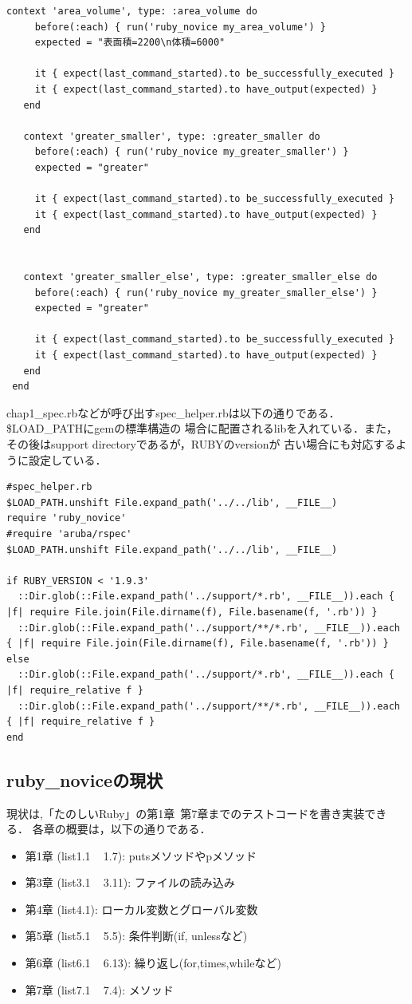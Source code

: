 \begin{lstlisting}[style=customRuby]
   context 'area_volume', type: :area_volume do
     before(:each) { run('ruby_novice my_area_volume') }
     expected = "表面積=2200\n体積=6000"
 
     it { expect(last_command_started).to be_successfully_executed }
     it { expect(last_command_started).to have_output(expected) }
   end
 
   context 'greater_smaller', type: :greater_smaller do
     before(:each) { run('ruby_novice my_greater_smaller') }
     expected = "greater"
 
     it { expect(last_command_started).to be_successfully_executed }
     it { expect(last_command_started).to have_output(expected) }
   end
 
 
   context 'greater_smaller_else', type: :greater_smaller_else do
     before(:each) { run('ruby_novice my_greater_smaller_else') }
     expected = "greater"
 
     it { expect(last_command_started).to be_successfully_executed }
     it { expect(last_command_started).to have_output(expected) }
   end
 end
\end{lstlisting}
chap1\_spec.rbなどが呼び出すspec\_helper.rbは以下の通りである．\$LOAD\_PATHにgemの標準構造の
場合に配置されるlibを入れている．また，その後はsupport directoryであるが，RUBYのversionが
古い場合にも対応するように設定している．
\begin{lstlisting}[style=customRuby]
#spec_helper.rb
$LOAD_PATH.unshift File.expand_path('../../lib', __FILE__)
require 'ruby_novice'
#require 'aruba/rspec'
$LOAD_PATH.unshift File.expand_path('../../lib', __FILE__)

if RUBY_VERSION < '1.9.3'
  ::Dir.glob(::File.expand_path('../support/*.rb', __FILE__)).each { |f| require File.join(File.dirname(f), File.basename(f, '.rb')) }
  ::Dir.glob(::File.expand_path('../support/**/*.rb', __FILE__)).each { |f| require File.join(File.dirname(f), File.basename(f, '.rb')) }
else
  ::Dir.glob(::File.expand_path('../support/*.rb', __FILE__)).each { |f| require_relative f }
  ::Dir.glob(::File.expand_path('../support/**/*.rb', __FILE__)).each { |f| require_relative f }
end
\end{lstlisting}
\subsection{ruby\_noviceの現状}
現状は,「たのしいRuby」の第1章~第7章までのテストコードを書き実装できる．
各章の概要は，以下の通りである．

\begin{itemize}
\item 第1章 (list1.1 ~ 1.7):  putsメソッドやpメソッド
\item 第3章 (list3.1 ~ 3.11): ファイルの読み込み
\item 第4章 (list4.1):        ローカル変数とグローバル変数
\item 第5章 (list5.1 ~ 5.5):  条件判断(if, unlessなど)
\item 第6章 (list6.1 ~ 6.13): 繰り返し(for,times,whileなど)
\item 第7章 (list7.1 ~ 7.4):  メソッド
\end{itemize}
